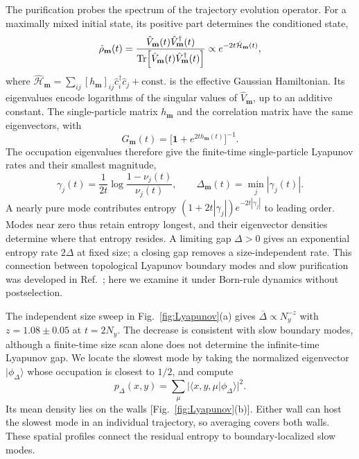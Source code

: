 \documentclass[aps,prb,10pt,twocolumn,superscriptaddress,longbibliography,floatfix]{revtex4-2}
\newcommand{\rec}{\mathbf m}   %
\begin{document}
{The purification probes the spectrum of the trajectory evolution operator. For a maximally mixed initial state, its positive part determines the conditioned state,
\begin{equation}
 \hat\rho_{\rec}(t)=\frac{\hat V_{\rec}(t)\hat V_{\rec}^\dagger(t)}
 {\Tr[\hat V_{\rec}(t)\hat V_{\rec}^\dagger(t)]}
 \propto e^{-2t\hat{\mathcal H}_{\rec}(t)},
 \label{eq:PurificationKrausProduct}
\end{equation}
where $\hat{\mathcal H}_{\rec}=\sum_{ij}[h_{\rec}]_{ij}\hat c_i^\dagger\hat c_j+\mathrm{const.}$ is the effective Gaussian Hamiltonian. Its eigenvalues encode logarithms of the singular values of $\hat V_{\rec}$, up to an additive constant. The single-particle matrix $h_{\rec}$ and the correlation matrix have the same eigenvectors, with
\begin{equation}
 G_{\rec}(t)=\big[\mathbf{1}+e^{2t h_{\rec}(t)}\big]^{-1}.
 \label{eq:PurificationFermiFunction}
\end{equation}
The occupation eigenvalues therefore give the finite-time single-particle Lyapunov rates and their smallest magnitude,
\begin{equation}
 \gamma_j(t)=\frac{1}{2t}\log\frac{1-\nu_j(t)}{\nu_j(t)},\qquad
 \Delta_{\rec}(t)=\min_j|\gamma_j(t)|.
 \label{eq:LyapunovFromOccupations}
\end{equation}
A nearly pure mode contributes entropy $(1+2t|\gamma_j|)e^{-2t|\gamma_j|}$ to leading order. Modes near zero thus retain entropy longest, and their eigenvector densities determine where that entropy resides. A limiting gap $\Delta>0$ gives an exponential entropy rate $2\Delta$ at fixed size; a closing gap removes a size-independent rate. This connection between topological Lyapunov boundary modes and slow purification was developed in Ref.~\cite{XiaoKawabata2026}; here we examine it under Born-rule dynamics without postselection.

The independent size sweep in Fig.~\ref{fig:Lyapunov}(a) gives $\overline\Delta\propto N_y^{-z}$ with $z=1.08\pm0.05$ at $t=2N_y$. The decrease is consistent with slow boundary modes, although a finite-time size scan alone does not determine the infinite-time Lyapunov gap. We locate the slowest mode by taking the normalized eigenvector $|\phi_{\Delta}\rangle$ whose occupation is closest to $1/2$, and compute
\begin{equation}
 p_{\Delta}(x,y)=\sum_\mu|\langle x,y,\mu|\phi_{\Delta}\rangle|^2.
 \label{eq:SlowestModeDensity}
\end{equation}
Its mean density lies on the walls [Fig.~\ref{fig:Lyapunov}(b)]. Either wall can host the slowest mode in an individual trajectory, so averaging covers both walls. These spatial profiles connect the residual entropy to boundary-localized slow modes.

}
\end{document}
